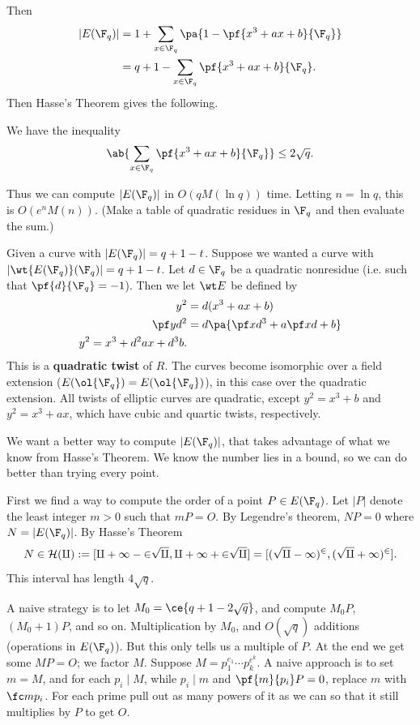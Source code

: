 Then
\begin{align*}
|E(\F_q)|&=1+\sum_{x\in \F_q} \pa{1-\pf{x^3+ax+b}{\F_q}}\\
&=q+1-\sum_{x\in \F_q} \pf{x^3+ax+b}{\F_q}.
\end{align*}
Then Hasse's Theorem gives the following.
\begin{cor}
We have the inequality
\[
\ab{
\sum_{x\in \F_q} \pf{x^3+ax+b}{\F_q}
}\le 2\sqrt q.
\]
\end{cor}
Thus we can compute $|E(\F_q)|$ in $O(qM(\ln q))$ time. Letting $n=\ln q$, this is $O(e^nM(n))$. (Make a table of quadratic residues in $\F_q$ and then evaluate the sum.)

Given a curve with $|E(\F_q)|=q+1-t$. 
Suppose we wanted a curve with $|\wt{E(\F_q)}(\F_q)|=q+1-t$. Let $d\in \F_q$ be a quadratic nonresidue (i.e. such that $\pf{d}{\F_q}=-1$). Then we let $\wt E$ be defined by
\begin{align*}
y^2 & =d(x^3+ax+b)\\
\pf yd^2 & = d\pa{
\pf xd^3+a\pf xd +b
}\\
y^2 = x^3+d^2ax+d^3b.
\end{align*}
This is a \textbf{quadratic twist} of $R$. The curves become isomorphic over a field extension ($E(\ol{\F_q})=E(\ol{\F_q})$), in this case over the quadratic extension. All twists of elliptic curves are quadratic, except $y^2=x^3+b$ and $y^2=x^3+ax$, which have cubic and quartic twists, respectively.

We want a better way to compute $|E(\F_q)|$, that takes advantage of what we know from Hasse's Theorem. We know the number lies in a bound, so we can do better than trying every point.

First we find a way to compute the order of a point $P\in E(\F_q)$. Let $|P|$ denote the least integer $m>0$ such that $mP=O$. By Legendre's theorem, $NP=0$ where $N=|E(\F_q)|$. By Hasse's Theorem 
\[
N\in \cal H(q):=[q+1-2\sqrt q,q+1+2\sqrt q]=[(\sqrt q-1)^2,(\sqrt q+1)^2].
\]
This interval has length $4\sqrt q$.

A naive strategy is to let $M_0=\ce{q+1-2\sqrt q}$, and compute $M_0P$, $(M_0+1)P$, and so on. Multiplication by $M_0$, and $O(\sqrt q)$ additions (operations in $E(\F_q)$). But this only tells us a multiple of $P$. At the end we get some $MP=O$; we factor $M$. Suppose $M=p_1^{e_1}\cdots p_k^{e^k}$. 
A naive approach is to set $m=M$, and for each $p_i\mid M$, while $p_i\mid m$ and $\pf{m}{p_i}P=0$, replace $m$ with $\fc m{p_i}$. For each prime pull out as many powers of it as we can so that it still multiplies by $P$ to get $O$.

